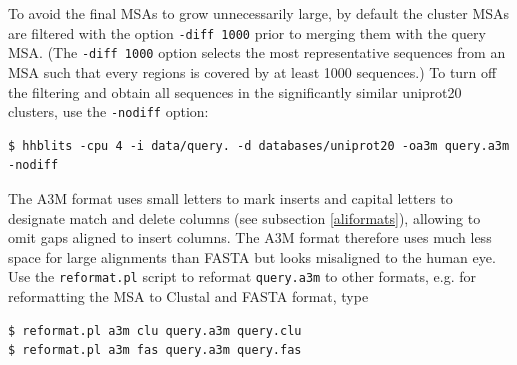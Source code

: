 \documentclass[11pt,a4paper]{article}
\begin{document}
To avoid the final MSAs to grow unnecessarily large, by default the cluster MSAs are filtered with the option \verb`-diff 1000` prior to merging them with the query MSA. (The \verb`-diff 1000` option selects the most representative sequences from an MSA such that every regions is covered by at least 1000 sequences.) To turn off the filtering and obtain all sequences in the significantly similar uniprot20 clusters, use the \verb`-nodiff` option: 
\begin{verbatim}
$ hhblits -cpu 4 -i data/query. -d databases/uniprot20 -oa3m query.a3m -nodiff
\end{verbatim}

The A3M format uses small letters to mark inserts and capital letters to designate match and delete columns (see subsection \ref{aliformats}), allowing to omit gaps aligned to insert columns. The A3M format therefore uses much less space for large alignments than FASTA but looks misaligned to the human eye. Use the \verb`reformat.pl` script to reformat \verb`query.a3m` to other formats, e.g. for reformatting the MSA to Clustal and FASTA format, type

\begin{verbatim}
$ reformat.pl a3m clu query.a3m query.clu
$ reformat.pl a3m fas query.a3m query.fas
\end{verbatim}
\end{document}
